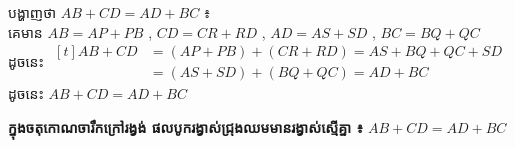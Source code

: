 \documentclass[theme=teal]{khmermath}
\newcommand{\alphabadge}[1]{\tikz[baseline=(char.base)]{\node[fill=brandCrimson, text=white, rounded corners=4pt, minimum size=15pt, inner sep=1pt, align=center, font=\fontsize{8.5}{8.5}\selectfont\bfseries] (char) {#1};}}
\begin{document}
\begin{khcard}
\vspace{1pt}
\noindent
\textbf{\alphabadge{ខ}} បង្ហាញថា $AB + CD = AD + BC$ ៖\\
\indent គេមាន $AB = AP + PB$ , $CD = CR + RD$ , $AD = AS + SD$ , $BC = BQ + QC$\\
\indent ដូចនេះ $\begin{aligned}[t]
  AB + CD &= (AP + PB) + (CR + RD) = AS + BQ + QC + SD\\
  &= (AS + SD) + (BQ + QC) = AD + BC
\end{aligned}$\\
\indent ដូចនេះ \textbf{$AB + CD = AD + BC$}\hfill{}
\end{khcard}
\vspace{-2pt}
\begin{khboxmagenta}
  \textbf{ក្នុងចតុកោណចារឹកក្រៅរង្វង់ ផលបូករង្វាស់ជ្រុងឈមមានរង្វាស់ស្មើគ្នា ៖}
 {\large\color{brandCrimson}\textbf{$AB + CD = AD + BC$}}
\end{khboxmagenta}

\vspace{2pt}
\setlength{\columnsep}{18pt}
\setlength{\columnseprule}{0.5pt}
\def\columnseprulecolor{\color{cardBorder}}
\end{document}
